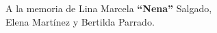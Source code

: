 \begin{flushright}
{\large A la memoria de Lina Marcela {\bf ``Nena''} Salgado,\\
Elena Martínez y Bertilda Parrado.}
\end{flushright}
